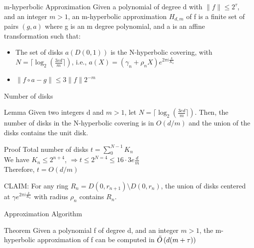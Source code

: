 \begin{frame}{m-hyperbolic Approximation}
    Given a polynomial of degree d with $\lVert f \rVert \le 2^\tau$, and an integer $m > 1$, an m-hyperbolic approximation $H_{d, m}$ of f is a finite set of pairs $(g, a)$ where g is an m degree polynomial, and a is an affine transformation such that:
    \begin{itemize}
        \item The set of disks $a \left(D(0, 1)\right)$ is the N-hyperbolic covering, with $N = \lceil \log_2 \left(\frac{3ed}{m} \rceil \right)$, i.e., $a(X) = \left(\gamma_n + \rho_n X\right) e^{2 \pi i \frac{k}{K_n}}$
        \item $\lVert f \circ a - g \rVert \le 3 \lVert f \rVert 2^{-m}$
    \end{itemize}

    \blfootnote{[Mor21]}
\end{frame}

\begin{frame}{Number of disks}
    \begin{block}
        {Lemma} Given two integers d and $m > 1$, let $N = \lceil \log_2 \left(\frac{3ed}{m} \rceil \right)$. Then, the number of disks in the N-hyperbolic covering is in $O(d/m)$ and the union of the disks contains the unit disk.
    \end{block}

    \begin{block}
        {Proof}
        Total number of disks $t = \sum_0^{N-1}K_n$ \\
        We have $K_n \le 2^{n+4}$, $\Rightarrow t \le 2^{N=4} \le 16 \cdot 3e \frac{d}{m}$ \\
        Therefore, $t = O(d/m)$

        CLAIM: For any ring $R_n = D(0, r_{n+1}) \setminus D(0, r_n)$, the union of disks centered at $\gamma e^{2 \pi i \frac{k}{K_n}}$ with radius $\rho_n$ contains $R_n$.
    \end{block}

    \blfootnote{[Mor21]}
\end{frame}

\begin{frame}{Approximation Algorithm}
    \begin{block}
    {Theorem}
        Given a polynomial f of degree d, and an integer $ m > 1$, the m-hyperbolic approximation of f can be computed in $\Tilde{O}\left(d(m+\tau)\right)$
    \end{block}
\end{frame}

